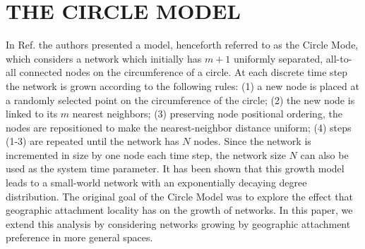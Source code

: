\documentclass[aps,pre,reprint,superscriptaddress,amsmath,amssymb,nofootinbib]{revtex4-1}
\begin{document}
\section{THE CIRCLE MODEL}
In Ref. \cite{ozik2004} the authors presented a model, henceforth referred to as the Circle Mode, which considers a network which initially has $m+1$ uniformly separated, all-to-all connected nodes on the circumference of a circle. 
At each discrete time step the network is grown according to the following rules: 
(1) a new node is placed at a randomly selected point on the circumference of the circle;
(2) the new node is linked to its $m$ nearest neighbors;
(3) preserving node positional ordering, the nodes are repositioned to make the nearest-neighbor distance uniform;
(4) steps (1-3) are repeated until the network has $N$ nodes.
Since the network is incremented in size by one node each time step, the network size $N$ can also be used as the system time parameter.  
It has been shown \cite{ozik2004} that this growth model leads to a small-world network with an exponentially decaying degree distribution. 
The original goal of the Circle Model was to explore the effect that geographic attachment locality has on the growth of networks.
In this paper, we extend this analysis by considering networks growing by geographic attachment preference in more general spaces. 
\end{document}
